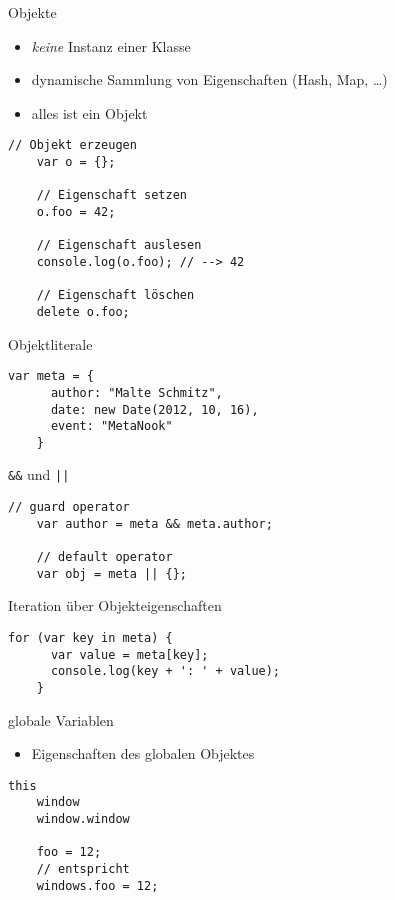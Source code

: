 \begin{frame}[fragile]{Objekte}
  \begin{itemize}
    \item \emph{keine} Instanz einer Klasse
    \item dynamische Sammlung von Eigenschaften (Hash, Map, \ldots)
    \item alles ist ein Objekt
  \end{itemize}
    
  \begin{lstlisting}[gobble=4]
    // Objekt erzeugen
    var o = {};
    
    // Eigenschaft setzen
    o.foo = 42;
    
    // Eigenschaft auslesen
    console.log(o.foo); // --> 42
    
    // Eigenschaft löschen
    delete o.foo;
  \end{lstlisting}  
\end{frame}

\begin{frame}[fragile]{Objektliterale}
  \begin{lstlisting}[gobble=4]
    var meta = {
      author: "Malte Schmitz",
      date: new Date(2012, 10, 16),
      event: "MetaNook"
    }
  \end{lstlisting}
\end{frame}

\begin{frame}[fragile]{\texttt{\&\&} und \texttt{||}}
  \begin{lstlisting}[gobble=4]
    // guard operator
    var author = meta && meta.author;
    
    // default operator
    var obj = meta || {};
  \end{lstlisting}
\end{frame}

\begin{frame}[fragile]{Iteration über Objekteigenschaften}
  \begin{lstlisting}[gobble=4]
    for (var key in meta) {
      var value = meta[key];
      console.log(key + ': ' + value);
    }
  \end{lstlisting}
\end{frame}

\begin{frame}[fragile]{globale Variablen}
  \begin{itemize}
    \item Eigenschaften des globalen Objektes
  \end{itemize}
  
  \begin{lstlisting}[gobble=4]
    this
    window
    window.window
  
    foo = 12;
    // entspricht
    windows.foo = 12;
  \end{lstlisting}
\end{frame}

